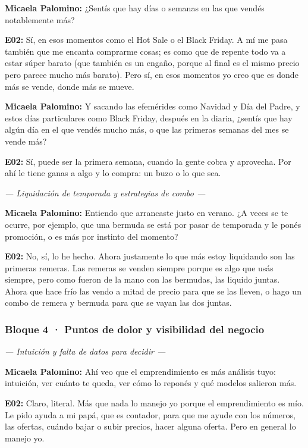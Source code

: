 \noindent\textbf{Micaela Palomino:} ¿Sentís que hay días o semanas en las que vendés notablemente más?

\noindent\textbf{E02:} Sí, en esos momentos como el Hot Sale o el Black Friday. A mí me pasa también que me encanta comprarme cosas; es como que de repente todo va a estar súper barato (que también es un engaño, porque al final es el mismo precio pero parece mucho más barato). Pero sí, en esos momentos yo creo que es donde más se vende, donde más se mueve.

\noindent\textbf{Micaela Palomino:} Y sacando las efemérides como Navidad y Día del Padre, y estos días particulares como Black Friday, después en la diaria, ¿sentís que hay algún día en el que vendés mucho más, o que las primeras semanas del mes se vende más?

\noindent\textbf{E02:} Sí, puede ser la primera semana, cuando la gente cobra y aprovecha. Por ahí le tiene ganas a algo y lo compra: un buzo o lo que sea.

\noindent\textit{--- Liquidación de temporada y estrategias de combo ---}

\noindent\textbf{Micaela Palomino:} Entiendo que arrancaste justo en verano. ¿A veces se te ocurre, por ejemplo, que una bermuda se está por pasar de temporada y le ponés promoción, o es más por instinto del momento?

\noindent\textbf{E02:} No, sí, lo he hecho. Ahora justamente lo que más estoy liquidando son las primeras remeras. Las remeras se venden siempre porque es algo que usás siempre, pero como fueron de la mano con las bermudas, las liquido juntas. Ahora que hace frío las vendo a mitad de precio para que se las lleven, o hago un combo de remera y bermuda para que se vayan las dos juntas.

\subsubsection*{Bloque 4 · Puntos de dolor y visibilidad del negocio}

\noindent\textit{--- Intuición y falta de datos para decidir ---}

\noindent\textbf{Micaela Palomino:} Ahí veo que el emprendimiento es más análisis tuyo: intuición, ver cuánto te queda, ver cómo lo reponés y qué modelos salieron más.

\noindent\textbf{E02:} Claro, literal. Más que nada lo manejo yo porque el emprendimiento es mío. Le pido ayuda a mi papá, que es contador, para que me ayude con los números, las ofertas, cuándo bajar o subir precios, hacer alguna oferta. Pero en general lo manejo yo.

